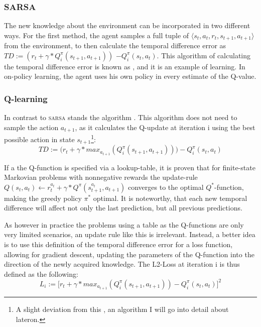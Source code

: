 \subsubsection{\textsc{SARSA}}
The new knowledge about the environment can be incorporated in two different ways. For the first method, the agent samples a full tuple of $\langle s_t, a_t, r_t, s_{t+1}, a_{t+1} \rangle$ from the environment, to then calculate the temporal difference error as 
$ TD := (r_t + \gamma * Q_i^\pi(s_{t+1}, a_{t+1}))$  $- Q_i^\pi(s_t, a_t)  $.
This algorithm of calculating the temporal difference error is known as  , and it is an example of  learning. In on-policy learning, the agent uses his own policy in every estimate of the Q-value. 

\subsubsection{Q-learning}

In contrast to \textsc{sarsa} stands the  algorithm . This algorithm does not need to sample the action $a_{t+1}$, as it calculates the Q-update at iteration i using the best possible action in state $s_{t+1}$\footnote{A slight deviation from this , an algorithm I will go into detail about lateron.}: 
\begin{equation} \label{eq:1.5}
	TD := \big( r_t + \gamma * max_{a_{t+1}}(Q_i^\pi(s_{t+1}, a_{t+1}))\big) - Q_i^\pi(s_t, a_t)
\end{equation}

If a the Q-function is specified via a lookup-table, it is proven that for finite-state Markovian problems with nonnegative rewards the update-rule\\ \mbox{$Q(s_t,a_t) \leftarrow r_t^{a_t} + \gamma * Q^\pi(s_{t+1}^{a_t},a_{t+1}) $} converges to the optimal $Q^*$-function, making the greedy policy $\pi^*$ optimal. It is noteworthy, that each new temporal difference will affect not only the last prediction, but all previous predictions.


As however in practice the problems using a table as the Q-functions are only very limited scenarios, an update rule like this is irrelevant. Instead, a better idea is to use this definition of the temporal difference error for a loss function, allowing for gradient descent, updating the parameters of the Q-function into the direction of the newly acquired knowledge. The L2-Loss at iteration i is thus defined as the following:
\begin{equation} \label{eq:1.6}
L_i := \big[r_t + \gamma * max_{a_{t+1}}(Q_i^\pi(s_{t+1}, a_{t+1})) - Q_i^\pi(s_t, a_t)\big]^2
\end{equation}



